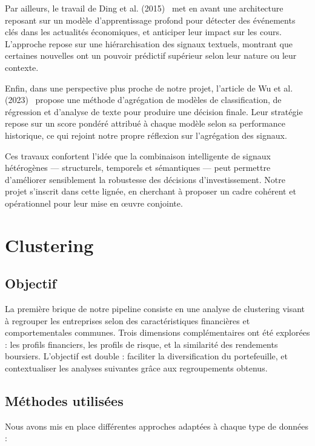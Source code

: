 \documentclass[a4paper,12pt]{article}
\begin{document}
Par ailleurs, le travail de Ding et al. (2015)~\cite{ding2015} met en avant une architecture reposant sur un modèle d’apprentissage profond pour détecter des événements clés dans les actualités économiques, et anticiper leur impact sur les cours. L’approche repose sur une hiérarchisation des signaux textuels, montrant que certaines nouvelles ont un pouvoir prédictif supérieur selon leur nature ou leur contexte.

Enfin, dans une perspective plus proche de notre projet, l’article de Wu et al. (2023)~\cite{wu2023} propose une méthode d’agrégation de modèles de classification, de régression et d’analyse de texte pour produire une décision finale. Leur stratégie repose sur un score pondéré attribué à chaque modèle selon sa performance historique, ce qui rejoint notre propre réflexion sur l’agrégation des signaux.

Ces travaux confortent l’idée que la combinaison intelligente de signaux hétérogènes — structurels, temporels et sémantiques — peut permettre d'améliorer sensiblement la robustesse des décisions d’investissement. Notre projet s’inscrit dans cette lignée, en cherchant à proposer un cadre cohérent et opérationnel pour leur mise en œuvre conjointe.

\section{Clustering}

\subsection*{Objectif}

La première brique de notre pipeline consiste en une analyse de clustering visant à regrouper les entreprises selon des caractéristiques financières et comportementales communes. Trois dimensions complémentaires ont été explorées : les profils financiers, les profils de risque, et la similarité des rendements boursiers. L'objectif est double : faciliter la diversification du portefeuille, et contextualiser les analyses suivantes grâce aux regroupements obtenus.

\subsection*{Méthodes utilisées}

Nous avons mis en place différentes approches adaptées à chaque type de données :
\end{document}
